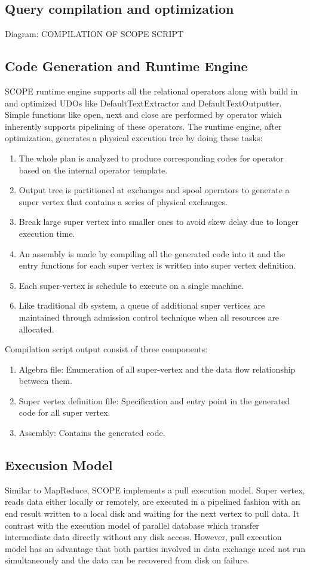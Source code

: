 \documentclass[runningheads,a4paper]{llncs}
\begin{document}
\subsection*{Query compilation and optimization}
Diagram: COMPILATION OF SCOPE SCRIPT

\subsection*{Code Generation and Runtime Engine}
SCOPE runtime engine supports all the relational operators along with build in and optimized UDOs like DefaultTextExtractor and DefaultTextOutputter. Simple functions like open, next and close are performed by operator which inherently supports pipelining of these operators.  The runtime engine, after optimization, generates a physical execution tree by doing these tasks:
\begin{enumerate}
	\item The whole plan is analyzed to produce corresponding codes for operator based on the internal operator template.
	\item  Output tree is partitioned at exchanges and spool operators to generate a super vertex that contains a series of physical exchanges.
	\item Break large super vertex into smaller ones to avoid skew delay due to longer execution time.
	\item An assembly is made by compiling all the generated code into it and the entry functions for each super vertex is written into super vertex definition.
	\item Each super-vertex is schedule to execute on a single machine.
	\item Like traditional db system, a queue of additional super vertices are maintained through admission control technique when all resources are allocated.
\end{enumerate}

Compilation script output consist of three components:
\begin{enumerate}
	\item Algebra file: Enumeration of all super-vertex and the data flow relationship between them.
	\item Super vertex definition file: Specification and entry point in the generated code for all super vertex.
	\item Assembly: Contains the generated code.
\end{enumerate}

\subsection*{Execusion Model}
Similar to MapReduce, SCOPE implements a pull execution model. Super vertex, reads data either locally or remotely, are executed in a pipelined fashion with an end result written to a local disk and waiting for the next vertex to pull data. It contrast with the execution model of parallel database which transfer intermediate data directly without any disk access. However, pull execution model has an advantage that both parties involved in data exchange need not run simultaneously and the data can be recovered from disk on failure.
\end{document}
